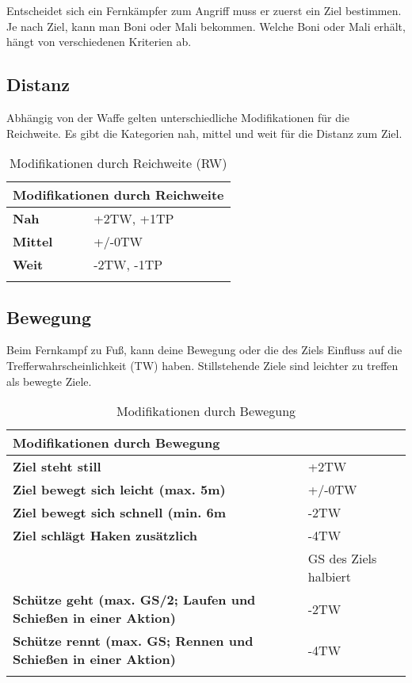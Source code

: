 Entscheidet sich ein Fernkämpfer zum Angriff muss er zuerst ein Ziel bestimmen. Je nach Ziel, kann man Boni oder Mali bekommen. Welche Boni oder Mali erhält, hängt von verschiedenen Kriterien ab.

\subsection{Distanz} 
Abhängig von der Waffe gelten unterschiedliche Modifikationen für die Reichweite. Es gibt die Kategorien nah, mittel und weit für die Distanz zum Ziel.

\begin{longtable}{|p{3cm}|p{5cm}|}
\hline
\multicolumn{2}{|l|}{\textbf{Modifikationen durch Reichweite}} \\ \hline
\textbf{Nah} & +2TW, +1TP \\ \hline
\textbf{Mittel} & +/-0TW \\ \hline
\textbf{Weit} & -2TW, -1TP \\ \hline

\caption{Modifikationen durch Reichweite (RW)}
\label{tab:ReichweitenModifikationen}
\end{longtable}

\subsection{Bewegung} 
Beim Fernkampf zu Fuß, kann deine Bewegung oder die des Ziels Einfluss auf die Trefferwahrscheinlichkeit (TW) haben. Stillstehende Ziele sind leichter zu treffen als bewegte Ziele.

\begin{longtable}{|p{6cm}|p{5cm}|}
\hline
\multicolumn{2}{|l|}{\textbf{Modifikationen durch Bewegung}} \\ \hline
\textbf{Ziel steht still} & +2TW \\ \hline
\textbf{Ziel bewegt sich leicht (max. 5m)} & +/-0TW \\ \hline
\textbf{Ziel bewegt sich schnell (min. 6m} & -2TW \\ \hline
\textbf{Ziel schlägt Haken zusätzlich} & -4TW \\
& GS des Ziels halbiert \\ \hline
\textbf{Schütze geht (max. GS/2; Laufen und Schießen in einer Aktion)} & -2TW \\ \hline
\textbf{Schütze rennt (max. GS; Rennen und Schießen in einer Aktion)} & -4TW \\ \hline

\caption{Modifikationen durch Bewegung}
\label{tab:BewegungModifikationen}
\end{longtable}

